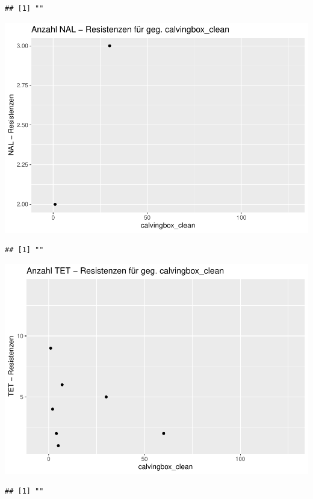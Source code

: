 \documentclass[
]{article}
\begin{document}
\begin{verbatim}
## [1] ""
\end{verbatim}

\includegraphics{NResistenzen_files/figure-latex/unnamed-chunk-6-27.pdf}

\begin{verbatim}
## [1] ""
\end{verbatim}

\includegraphics{NResistenzen_files/figure-latex/unnamed-chunk-6-28.pdf}

\begin{verbatim}
## [1] ""
\end{verbatim}
\end{document}
